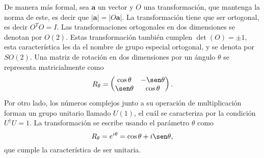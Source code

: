 De manera más formal, sea $\mathbf{a}$ un vector y $O$ una transformación, que mantenga la norma de este, es decir que $|\mathbf{a}| = |O\mathbf{a}|$. La transformación tiene que ser ortogonal, es decir $O^{T}O = I$. Las transformaciones ortogonales en dos dimensiones se denotan por $O(2)$. Estas transformación también cumplen $\det(O) = \pm 1$, esta característica les da el nombre de grupo especial ortogonal, y se denota por $SO(2)$. Una matriz de rotación en dos dimensiones por un ángulo $\theta$ se representa matricialmente como
\begin{equation}
  R_\theta = \begin{pmatrix}
    \cos\theta & -\sen\theta \\
    \sen\theta & \cos\theta
  \end{pmatrix}.
\end{equation}
Por otro lado, los números complejos junto a su operación de multiplicación forman un grupo unitario llamado $U(1)$, el cuál se caracteriza por la condición $U^\dagger U = 1$. La transformación se escribe usando el parámetro $\theta$ como
\begin{equation}
  R_\theta = e^{i\theta} = \cos\theta + i\sen\theta,
\end{equation}
que cumple la característica de ser unitaria.

